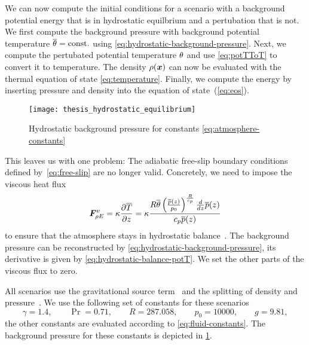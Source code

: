We can now compute the initial conditions for a scenario with a background potential energy that is in hydrostatic equilbrium and a pertubation that is not.
We first compute the background pressure with background potential temperature $\overline{\theta} = \text{const.}$ using \cref{eq:hydrostatic-background-pressure}.
Next, we compute the pertubated potential temperature $\theta$ and use \cref{eq:potTToT} to convert it to temperature.
The density $\rho(\bm{x})$ can now be evaluated with the thermal equation of state \cref{eq:temperature}.
Finally, we compute the energy by inserting pressure and density into the equation of state~(\ref{eq:eos}).

\begin{figure}[tb]
  \centering
  \texttt{[image: thesis\_hydrostatic\_equilibrium]}
  \caption{\label{fig:hydrostatic-p}%
    Hydrostatic background pressure for constants \cref{eq:atmosphere-constants}}
\end{figure}

This leaves us with one problem:
The adiabatic free-slip boundary conditions defined by~\cref{eq:free-slip} are no longer valid.
Concretely, we need to impose the viscous heat flux
\begin{equation}
  \label{eq:atmosphere-bc}
  \bm{F}^{v}_{\rho E} = \kappa \pdv{\overline{T}}{z} =
\kappa \frac{R \overline{\theta} \left(\frac{\overline{p}{\left (z \right )}}{p_{0}}\right)^{\frac{R}{c_{p}}} \frac{d}{d z} \overline{p}{\left (z \right )}}{c_{p} \overline{p}{\left (z \right )}}
\end{equation}
to ensure that the atmosphere stays in hydrostatic balance~\cite{giraldo2008study}.
The background pressure can be reconstructed by \cref{eq:hydrostatic-background-pressure}, its derivative is given by \cref{eq:hydrostatic-balance-potT}.
We set the other parts of the viscous flux to zero.

All scenarios use the gravitational source term~ and the splitting of density and pressure~.
We use the following set of constants for these scenarios
\begin{equation}\label{eq:atmosphere-constants}
    \gamma = 1.4 ,\qquad \Pr =  0.71 ,\qquad R = 287.058 ,\qquad p_0 = 10000, \qquad g = 9.81,
\end{equation}
the other constants are evaluated according to \cref{eq:fluid-constants}.
The background pressure for these constants is depicted in \cref{fig:hydrostatic-p}.

